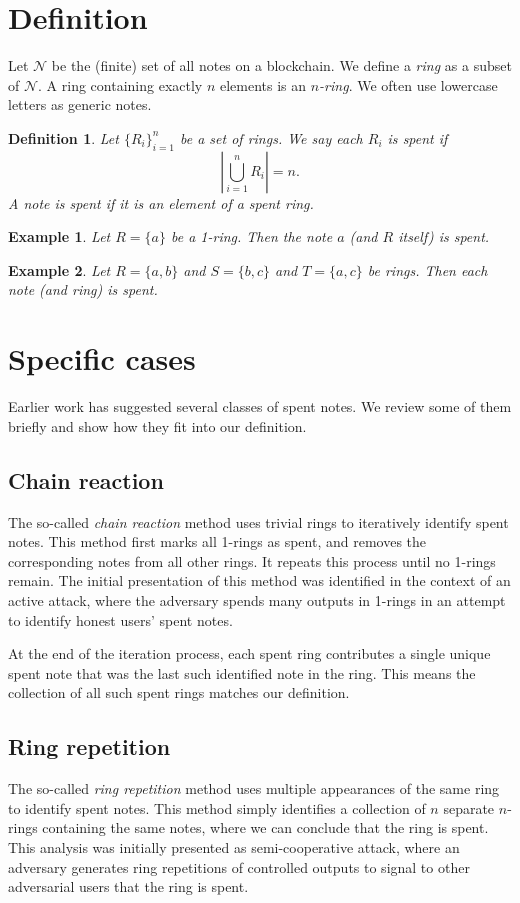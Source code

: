 \documentclass{mrl}
\newtheorem{definition}{Definition}
\newtheorem{example}{Example}
\begin{document}
\section{Definition}
Let $\mathcal{N}$ be the (finite) set of all notes on a blockchain. We define a \textit{ring} as a subset of $\mathcal{N}$. A ring containing exactly $n$ elements is an $n$\textit{-ring}. We often use lowercase letters as generic notes.

\begin{definition}
Let $\{R_i\}_{i=1}^n$ be a set of rings. We say each $R_i$ is \textit{spent} if $$\left| \bigcup_{i=1}^n R_i \right| = n.$$ A note is \textit{spent} if it is an element of a spent ring.
\end{definition}

\begin{example}
Let $R = \{a\}$ be a 1-ring. Then the note $a$ (and $R$ itself) is spent.
\end{example}

\begin{example}
Let $R = \{a,b\}$ and $S = \{b,c\}$ and $T = \{a,c\}$ be rings. Then each note (and ring) is spent.
\end{example}

\section{Specific cases}
Earlier work has suggested several classes of spent notes. We review some of them briefly and show how they fit into our definition.

\subsection{Chain reaction}
The so-called \textit{chain reaction} method uses trivial rings to iteratively identify spent notes. This method first marks all 1-rings as spent, and removes the corresponding notes from all other rings. It repeats this process until no 1-rings remain. The initial presentation of this method was identified in the context of an active attack, where the adversary spends many outputs in 1-rings in an attempt to identify honest users' spent notes.

At the end of the iteration process, each spent ring contributes a single unique spent note that was the last such identified note in the ring. This means the collection of all such spent rings matches our definition.

\subsection{Ring repetition}
The so-called \textit{ring repetition} method uses multiple appearances of the same ring to identify spent notes. This method simply identifies a collection of $n$ separate $n$-rings containing the same notes, where we can conclude that the ring is spent. This analysis was initially presented as semi-cooperative attack, where an adversary generates ring repetitions of controlled outputs to signal to other adversarial users that the ring is spent.
\end{document}
